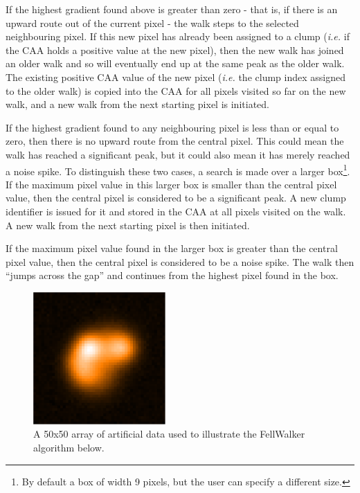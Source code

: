\documentclass[final,authoryear,5p,times,twocolumn]{elsarticle}
\begin{document}
If the highest gradient found above is greater than zero - that is, if
there is an upward route out of the current pixel - the walk steps to the
selected neighbouring pixel. If this new pixel has already been assigned
to a clump (\emph{i.e.} if the CAA holds a positive value at the new
pixel), then the new walk has joined an older walk and so will eventually
end up at the same peak as the older walk. The existing positive CAA
value of the new pixel (\emph{i.e.} the clump index assigned to the older
walk) is copied into the CAA for all pixels visited so far on the new
walk, and a new walk from the next starting pixel is initiated.

If the highest gradient found to any neighbouring pixel is less than or
equal to zero, then there is no upward route from the central pixel. This
could mean the walk has reached a significant peak, but it could also
mean it has merely reached a noise spike. To distinguish these two cases,
a search is made over a larger box\footnote{By default a box of width 9
pixels, but the user can specify a different size.}. If the maximum pixel
value in this larger box is smaller than the central pixel value, then
the central pixel is considered to be a significant peak. A new clump
identifier is issued for it and stored in the CAA at all pixels visited
on the walk. A new walk from the next starting pixel is then initiated.

If the maximum pixel value found in the larger box is greater than the
central pixel value, then the central pixel is considered to be a noise
spike. The walk then ``jumps across the gap'' and continues from the
highest pixel found in the box.

\begin{figure}
\includegraphics[width=0.45\textwidth]{sim.pdf}
\caption{A 50x50 array of artificial data used to illustrate the
FellWalker algorithm below.}
\label{fig:sim}
\end{figure}
\end{document}
